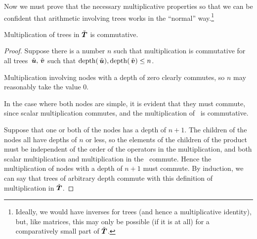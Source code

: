 Now we must prove that the necessary multiplicative properties so that
we can be confident that arithmetic involving trees works in the
``normal'' way.\footnote{Ideally, we would have inverses for trees
  (and hence a multiplicative identity), but, like matrices, this may
  only be possible (if it is at all) for a comparatively small part of
  $\check{\boldsymbol{T}}$.} 

\begin{proposition}\label{TMcommutativity}
Multiplication of trees in $\check{\boldsymbol{T}}$ is commutative.
\begin{proof}
  Suppose there is a number $n$ such that multiplication is
  commutative for all trees $\,\check{\boldsymbol{u}}, \,\check{\boldsymbol{v}}$ such that
  $\operatorname{depth}(\,\check{\boldsymbol{u}}), \operatorname{depth}(\,\check{\boldsymbol{v}}) \le n$.

  Multiplication involving nodes with a depth of zero clearly
  commutes, so $n$ may reasonably take the value 0.

  In the case where both nodes are simple, it is evident that
  they must commute, since scalar multiplication commutes, and the
  multiplication of \polytypes\ is commutative.

  Suppose that one or both of the nodes has a depth of $n+1$. The
  children of the nodes all have depths of $n$ or less, so the
  elements of the children of the product must be independent of
  the order of the operators in the multiplication, and both scalar
  multiplication and multiplication in the \polytypes\  commute.  Hence the
  multiplication of nodes with a depth of $n+1$ must commute.  By
  induction, we can say that trees of arbitrary depth commute with
  this definition of multiplication in $\check{\boldsymbol{T}}$.
  \end{proof}
\end{proposition}

